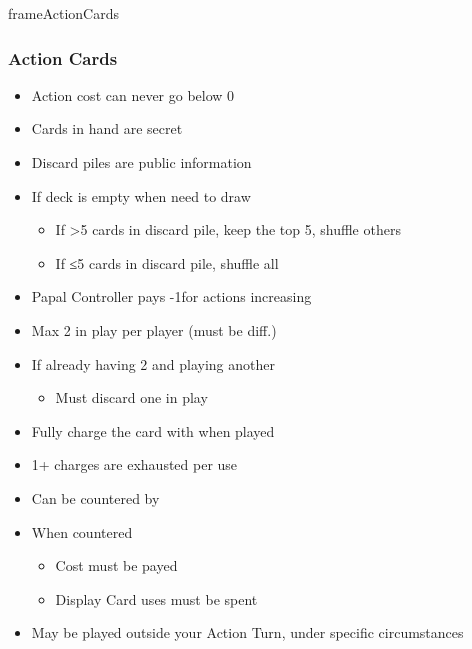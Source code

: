 \documentclass[10pt]{article}
\newlength{\fhTrade} \setlength\fhTrade{43.5\baselineskip}
\newlength{\fhActionCards} \setlength\fhActionCards{\calc{\textheight - \fhTrade - \frameToFrameSpacing}}
\begin{document}
\begin{dynamiccontents*}{frameActionCards}\begin{eubox}{\fhActionCards}
	\begin{multicols}{2}
		\subsubsection*{Action Cards }
		\begin{itemize}
			\item Action cost can never go below 0
			\item Cards in hand are secret
			\item Discard piles are public information
			\item If deck is empty when need to draw 
			\begin{itemize}
				\item If >5 cards in discard pile, keep the top 5, shuffle others
				\item If ≤5 cards in discard pile, shuffle all
			\end{itemize}
			\item Papal Controller pays -1\adminpower for actions increasing \stability
		\end{itemize}
		\begin{itemize}
			\item Max 2 in play per player (must be diff.)
			\item If already having 2 and playing another
			\begin{itemize}
				\item Must discard one in play
			\end{itemize}
			\item Fully charge the card with \cubes when played
			\item 1+ charges are exhausted per use
		\end{itemize}
		\begin{itemize}
			\item Can be countered by 
			\item When countered
			\begin{itemize}
				\item Cost must be payed
				\item Display Card uses must be spent
			\end{itemize}
		\end{itemize}
		\begin{itemize}
			\item May be played outside your Action Turn, under specific circumstances
		\end{itemize}
	\end{multicols}
\end{eubox}\end{dynamiccontents*}
\end{document}
